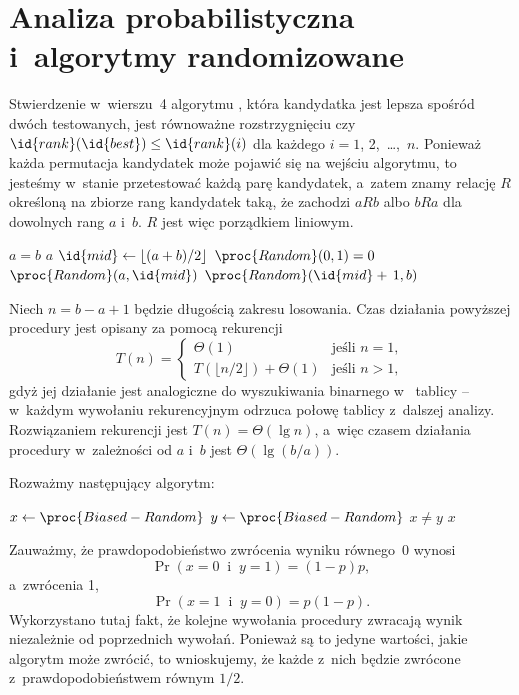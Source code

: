 \chapter{Analiza probabilistyczna i~algorytmy randomizowane}


\exercise %
Stwierdzenie w~wierszu~4 algorytmu , która kandydatka jest lepsza spośród dwóch testowanych, jest równoważne rozstrzygnięciu czy $\id{rank}(\id{best})\le\id{rank}(i)$ dla każdego $i=1$, 2,~\dots,~$n$. Ponieważ każda permutacja kandydatek może pojawić się na wejściu algorytmu, to jesteśmy w~stanie przetestować każdą parę kandydatek, a~zatem znamy relację $R$ określoną na zbiorze rang kandydatek taką, że zachodzi $aRb$ albo $bRa$ dla dowolnych rang $a$ i~$b$. $R$ jest więc porządkiem liniowym.

\exercise %
\begin{codebox}
\li	\If $a=b$
\li		\Then
			\Return $a$
		\End
\li	$\id{mid}\gets\lfloor(a+b)/2\rfloor$
\li	\If $\proc{Random}(0,1)=0$
\li		\Then
			\Return $\proc{Random}(a,\id{mid})$
\li		\Else
			\Return $\proc{Random}(\id{mid}+\,1,b)$
		\End
\end{codebox}
Niech $n=b-a+1$ będzie długością zakresu losowania. Czas działania powyższej procedury jest opisany za pomocą rekurencji
\[
    T(n) =
	\begin{cases}
		\Theta(1) & \text{jeśli $n=1$}, \\
		T(\lfloor n/2\rfloor)+\Theta(1) & \text{jeśli $n>1$},
    \end{cases}
\]
gdyż jej działanie jest analogiczne do wyszukiwania binarnego w~ tablicy -- w~każdym wywołaniu rekurencyjnym odrzuca połowę tablicy z~dalszej analizy. Rozwiązaniem rekurencji jest $T(n)=\Theta(\lg n)$, a~więc czasem działania procedury  w~zależności od $a$ i~$b$ jest $\Theta(\lg(b/a))$.

\exercise %
Rozważmy następujący algorytm:
\begin{codebox}
\li	\Repeat
		$x\gets\proc{Biased-Random}$
\li		$y\gets\proc{Biased-Random}$
\li	\Until $x\ne y$ \label{li:unbiased-repeat-end}
\li \Return $x$
\end{codebox}
Zauważmy, że prawdopodobieństwo zwrócenia wyniku równego~0 wynosi
\[
	\Pr(x=0\;\;\text{i}\;\;y=1) = (1-p)p,
\]
a~zwrócenia 1,
\[
	\Pr(x=1\;\;\text{i}\;\;y=0) = p(1-p).
\]
Wykorzystano tutaj fakt, że kolejne wywołania procedury  zwracają wynik niezależnie od poprzednich wywołań. Ponieważ są to jedyne wartości, jakie algorytm może zwrócić, to wnioskujemy, że każde z~nich będzie zwrócone z~prawdopodobieństwem równym $1/2$.


